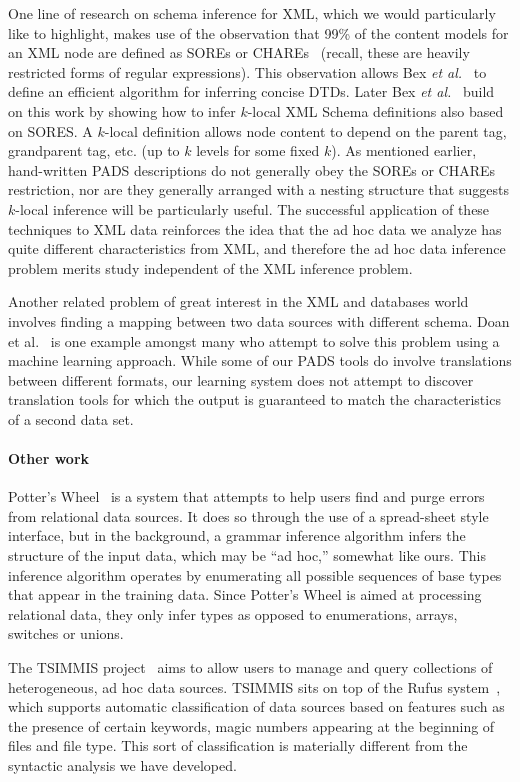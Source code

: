 One line of research on schema inference for XML, which we would
particularly like to highlight, makes use of the 
observation that 99\% of the content models for an XML node are defined as
SOREs or CHAREs~\cite{martens+:expressiveness-xml-schema} (recall, these
are heavily restricted forms of regular expressions).  
This observation allows Bex {\em et al.}~\cite{bex+:dtd-inference} to define
an efficient algorithm for inferring concise DTDs.  Later 
Bex {\em et al.}~\cite{bex+:inferring-xml-schema} build on this work 
by showing how to infer $k$-local XML Schema definitions also based on
SORES.  A $k$-local definition allows node content to depend on the parent
tag, grandparent tag, etc. (up to $k$ levels for some fixed $k$).
As mentioned earlier, hand-written PADS descriptions do not generally obey
the SOREs or CHAREs restriction, nor are they generally arranged with a nesting
structure that suggests $k$-local inference will be particularly useful.
The successful application of these techniques to XML data reinforces 
the idea that the ad hoc data we analyze has quite different characteristics
from XML, and therefore the ad hoc data inference problem merits study
independent of the XML inference problem.

Another related problem of great interest in the XML and databases world
involves finding a mapping between two data sources with different schema.
Doan et al.~\cite{doan+:disparate-data-sources} is one example amongst
many who attempt to solve this problem using a machine learning approach.
While some of our PADS tools do involve translations between
different formats, our learning system does not attempt to discover
translation tools for which the output is guaranteed to match 
the characteristics of a second data set.

\paragraph*{Other work}
Potter's Wheel~\cite{raman+:potterwheel} is a system that attempts to
help users find and purge errors from
relational data sources.  It does so through the use of a spread-sheet
style interface, but in the background, a grammar inference algorithm
infers the structure of the input data, which may be ``ad hoc,'' 
somewhat like ours.  This inference algorithm operates by
enumerating all possible sequences of base types that appear
in the training data.  
Since Potter's Wheel is aimed at processing
relational data, they only infer  types
as opposed to enumerations, arrays, switches or unions.  

The TSIMMIS project~\cite{chawathe+:tsimmis} aims to
allow users to manage and query collections of heterogeneous, ad hoc
data sources.  TSIMMIS sits on top of the Rufus
system~\cite{shoens+:rufus}, which supports automatic classification
of data sources based on features such as the presence of certain
keywords, magic numbers appearing at the beginning of files and file
type.  
This sort of classification is materially
different from the syntactic analysis we have developed.
